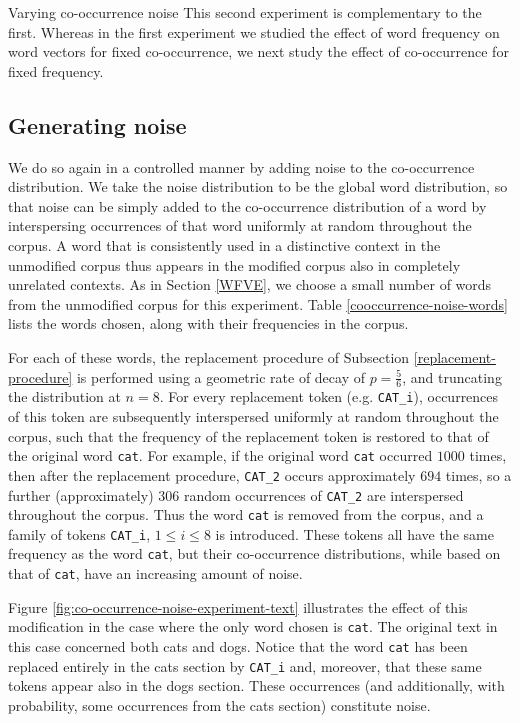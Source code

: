 \documentclass{article} %
\newcommand{\word}[1]{\texttt{#1}}
\begin{document}
\begin{section}{Varying co-occurrence noise}\label{CNVE}
This second experiment is complementary to the first.  Whereas in the
first experiment we studied the effect of word frequency on word vectors
for fixed co-occurrence, we next study the effect of co-occurrence for
fixed frequency.
  
\subsection{Generating noise}
We do so again in a controlled manner by adding noise to the
co-occurrence distribution.  We take the noise distribution to be the
global word distribution, so that noise can be simply added to the
co-occurrence distribution of a word by interspersing occurrences of
that word uniformly at random throughout the corpus.  A word that is
consistently used in a distinctive context in the unmodified corpus thus
appears in the modified corpus also in completely unrelated contexts.
As in Section \ref{WFVE}, we choose a small number of words from the
unmodified corpus for this experiment.  Table
\ref{cooccurrence-noise-words} lists the words chosen, along with their
frequencies in the corpus.

For each of these words, the replacement procedure of Subsection
\ref{replacement-procedure} is performed using a geometric rate of decay
of $p = \tfrac{5}{6}$, and truncating the distribution at $n=8$.  For
every replacement token (e.g. \word{CAT\_i}), occurrences of this
token are subsequently interspersed uniformly at random throughout the
corpus, such that the frequency of the replacement token is restored to
that of the original word \word{cat}.  For example, if the original word
\word{cat} occurred $1000$ times, then after the replacement procedure,
\word{CAT\_2} occurs approximately $694$ times, so a further
(approximately) $306$ random occurrences of \word{CAT\_2} are
interspersed throughout the corpus.  Thus the word \word{cat} is removed
from the corpus, and a family of tokens \word{CAT\_i}, $1 \leqslant i
\leqslant 8$ is introduced.  These tokens all have the same frequency as
the word \word{cat}, but their co-occurrence distributions, while based
on that of \word{cat}, have an increasing amount of noise.

Figure \ref{fig:co-occurrence-noise-experiment-text} illustrates the
effect of this modification in the case where the only word chosen is
\word{cat}.  The original text in this case concerned both cats and
dogs.  Notice that the word \word{cat} has been replaced entirely in the
cats section by \word{CAT\_i} and, moreover, that these same tokens
appear also in the dogs section. These occurrences (and additionally,
with probability, some occurrences from the cats section) constitute
noise.


\end{section}
\end{document}
